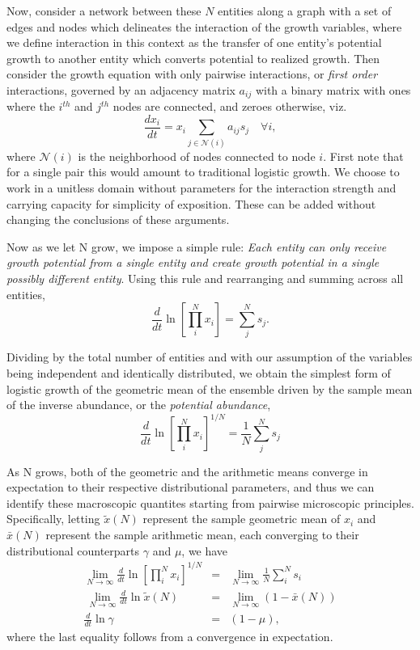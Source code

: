 \documentclass{article}
\begin{document}
Now, consider a network between these $N$ entities along a graph with a set of edges and nodes which delineates the interaction of the growth variables, where we define interaction in this context as the transfer of one entity's potential growth to another entity which converts potential to realized growth. Then consider the growth equation with only pairwise interactions, or \textit{first order} interactions, governed by an adjacency matrix ${a_{ij}}$ with a binary matrix with ones where the $i^{th}$ and $j^{th}$ nodes are connected, and zeroes otherwise, viz.
\begin{equation}
\label{eq:modSIR}
\frac{d x_i}{dt} = x_i\sum_{j \in \mathcal{N}(i)}{a_{ij}}s_{j} \quad \forall i,
\end{equation}
where $\mathcal{N}(i)$ is the neighborhood of nodes connected to node $i$.
First note that for a single pair this would amount to traditional logistic growth. We choose to work in a unitless domain without parameters for the interaction strength and carrying capacity for simplicity of exposition. These can be added without changing the conclusions of these arguments. 

Now as we let N grow, we impose a simple rule: \textit{Each entity can only receive growth potential from a single entity and create growth potential in a single possibly different entity}. Using this rule and rearranging and summing across all entities,
\begin{equation}
\label{eq:modSIR2}
\frac{d}{dt} \ln \left[ \prod_i^N x_i \right ] = \sum_j^N s_{j}.
\end{equation}

Dividing by the total number of entities and with our assumption of the variables being independent and identically distributed, we obtain the simplest form of logistic growth of the geometric mean of the ensemble driven by the sample mean of the inverse abundance, or the \textit{potential abundance}, 
\begin{equation}
\label{eq:modSIR3}
\frac{d}{dt} \ln \left[ \prod_i^N x_i \right ]^{1/N} = \frac{1}{N}\sum_j^N s_j 
\end{equation}

As N grows, both of the geometric and the arithmetic means converge in expectation to their respective distributional parameters, and thus we can identify these macroscopic quantites starting from pairwise microscopic principles. Specifically, letting $\tilde{x}(N)$ represent the sample geometric mean of $x_i$ and $\bar{x}(N)$ represent the sample arithmetic mean, each converging to their distributional counterparts $\gamma$ and $\mu$, we have 
\begin{eqnarray*}
  \lim_{N\rightarrow \infty} \frac{d}{dt} \ln \left[ \prod_i^N x_i \right ]^{1/N} &=& \lim_{N\rightarrow \infty} \frac{1}{N}\sum_i^N s_i \\\
  \lim_{N\rightarrow \infty} \frac{d}{dt} \ln \tilde{x}(N) &=& \lim_{N\rightarrow \infty}(1 - \bar{x}(N)) \\
  \frac{d}{dt} \ln \gamma &=&(1 - \mu),
\end{eqnarray*}
where the last equality follows from a convergence in expectation.
\end{document}

